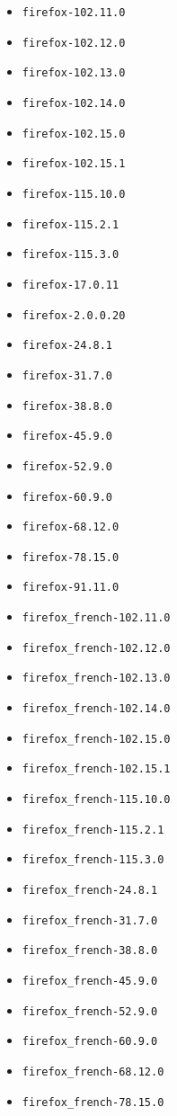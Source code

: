 \begin{multicols}{3}
\begin{itemize}
\item \verb|firefox-102.11.0|
\item \verb|firefox-102.12.0|
\item \verb|firefox-102.13.0|
\item \verb|firefox-102.14.0|
\item \verb|firefox-102.15.0|
\item \verb|firefox-102.15.1|
\item \verb|firefox-115.10.0|
\item \verb|firefox-115.2.1|
\item \verb|firefox-115.3.0|
\item \verb|firefox-17.0.11|
\item \verb|firefox-2.0.0.20|
\item \verb|firefox-24.8.1|
\item \verb|firefox-31.7.0|
\item \verb|firefox-38.8.0|
\item \verb|firefox-45.9.0|
\item \verb|firefox-52.9.0|
\item \verb|firefox-60.9.0|
\item \verb|firefox-68.12.0|
\item \verb|firefox-78.15.0|
\item \verb|firefox-91.11.0|
\item \verb|firefox_french-102.11.0|
\item \verb|firefox_french-102.12.0|
\item \verb|firefox_french-102.13.0|
\item \verb|firefox_french-102.14.0|
\item \verb|firefox_french-102.15.0|
\item \verb|firefox_french-102.15.1|
\item \verb|firefox_french-115.10.0|
\item \verb|firefox_french-115.2.1|
\item \verb|firefox_french-115.3.0|
\item \verb|firefox_french-24.8.1|
\item \verb|firefox_french-31.7.0|
\item \verb|firefox_french-38.8.0|
\item \verb|firefox_french-45.9.0|
\item \verb|firefox_french-52.9.0|
\item \verb|firefox_french-60.9.0|
\item \verb|firefox_french-68.12.0|
\item \verb|firefox_french-78.15.0|

\end{itemize}
\end{multicols}
